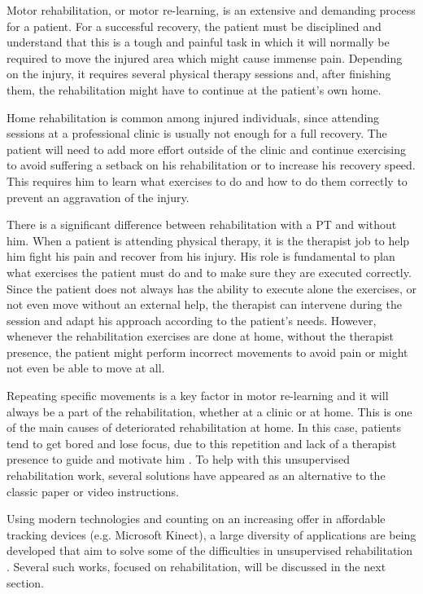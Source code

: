 \documentclass[runningheads]{llncs}
\begin{document}
Motor rehabilitation, or motor re-learning, is an extensive and demanding process for a patient.
For a successful recovery, the patient must be disciplined and understand that this is a tough and painful task in which it
will normally be required to move the injured area which might cause immense pain\cite{Singh2014a}.
Depending on the injury, it requires several physical therapy sessions and, after finishing them, 
the rehabilitation might have to continue at the patient's own home\cite{Lohse2013}.

Home rehabilitation is common among injured individuals, since
attending sessions at a professional clinic is usually not enough for a full recovery.
The patient will need to add more effort outside of the clinic and continue 
exercising to avoid suffering a setback on his rehabilitation \cite{Borghese2013} 
or to increase his recovery speed. 
This requires him to learn what exercises to do and how to do 
them correctly to prevent an aggravation of the injury\cite{Tang2014a}.

There is a significant difference between rehabilitation with a \ac{PT} and without him.
When a patient is attending physical therapy, it is the therapist 
job to help him fight his pain and recover from his injury.
His role is fundamental to plan what exercises the patient must do and to make sure they are executed correctly. 
Since the patient does not always has the ability to execute alone the exercises, or not even move without an external help,
the therapist can intervene during the session and adapt his approach according to the patient's needs\cite{Sigrist2013}.
However, whenever the rehabilitation exercises are done at home, without the therapist presence, the patient might 
perform incorrect movements to avoid pain\cite{Tang2014a} or might not even be able to move at all.


Repeating specific movements is a key factor in motor re-learning \cite{Schonauer2011a} and it 
will always be a part of the rehabilitation, whether at a clinic or at home.
This is one of the main causes of deteriorated rehabilitation at home. In this case, patients tend to get bored and lose focus, 
due to this repetition and lack of a therapist presence to guide and motivate him \cite{Singh2014a, Balaam2011a, Rego2010}. 
To help with this unsupervised rehabilitation work, several solutions have appeared as 
an alternative to the classic paper or video instructions. 

Using modern technologies and counting on an increasing offer in 
affordable tracking devices (e.g. Microsoft Kinect), a large
diversity of applications are being developed that aim to solve 
some of the difficulties in unsupervised rehabilitation \cite{Kitsunezaki2013,Borghese2013}. Several such works, focused on rehabilitation, will be discussed in the next section.
\end{document}
